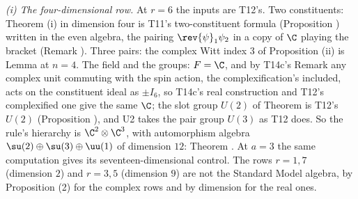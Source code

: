 \emph{(i) The four-dimensional row.}  At $r = 6$ the inputs are T12's. Two constituents: Theorem (i) in dimension four is T11's two-constituent formula (Proposition ) written in the even algebra, the pairing $\rev{\psi}_{1}\psi_{2}$ in a copy of $\C$ playing the bracket (Remark ). Three pairs: the complex Witt index $3$ of Proposition (ii) is Lemma  at $n = 4$. The field and the groups: $F = \C$, and by T14c's Remark  any complex unit commuting with the spin action, the complexification's included, acts on the constituent ideal as $\pm I_{6}$, so T14c's real construction and T12's complexified one give the same $\C$; the slot group $U(2)$ of Theorem  is T12's $U(2)$ (Proposition ), and U2 takes the pair group $U(3)$ as T12 does. So the rule's hierarchy is $\C^{2} \otimes \C^{3}$, with automorphism algebra $\su(2) \oplus \su(3) \oplus \uu(1)$ of dimension $12$: Theorem . At $a = 3$ the same computation gives its seventeen-dimensional control. The rows $r = 1, 7$ (dimension $2$) and $r = 3, 5$ (dimension $9$) are not the Standard Model algebra, by Proposition (2) for the complex rows and by dimension for the real ones.

